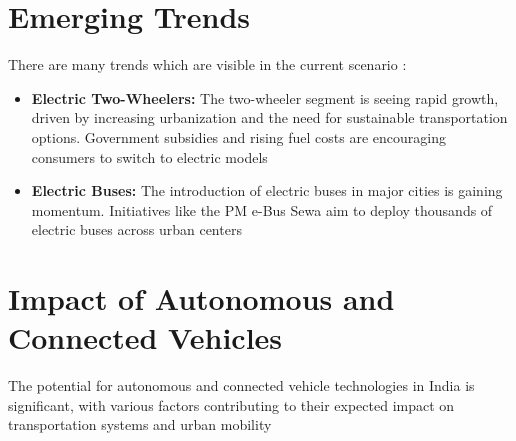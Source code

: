 \documentclass[a4paper,12pt]{report}
\begin{document}
\section{Emerging Trends}
There are many trends which are visible in the current scenario :
\begin{itemize}
    \item \textbf{Electric Two-Wheelers: }
    The two-wheeler segment is seeing rapid growth, driven by increasing urbanization and the need for sustainable transportation options. Government subsidies and rising fuel costs are encouraging consumers to switch to electric models
    \item \textbf{Electric Buses: } The introduction of electric buses in major cities is gaining momentum. Initiatives like the PM e-Bus Sewa aim to deploy thousands of electric buses across urban centers\cite{changingTransport}
    
\end{itemize}








\section{Impact of Autonomous and Connected Vehicles}
The potential for autonomous and connected vehicle technologies in India is significant, with various factors contributing to their expected impact on transportation systems and urban mobility
\end{document}
